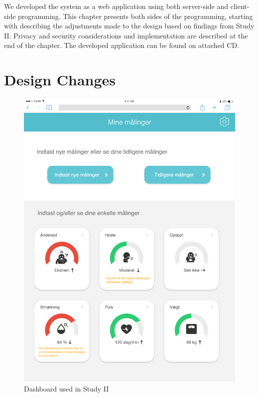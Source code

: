 We developed the system as a web application using both server-side and client-side programming. This chapter presents both sides of the programming, starting with describing the adjustments made to the design based on findings from Study II. Privacy and security considerations and implementation are described at the end of the chapter. The developed application can be found on attached CD. 

\section{Design Changes}

\begin{figure}[h]
  \centering
  \begin{minipage}[b]{0.45\textwidth}
    \includegraphics[width=\textwidth]{images/study2/Dashboard.png}
    \caption{Dashboard used in Study II}
    \label{fig:db1st}
  \end{minipage}
  \hfill

\end{figure}

